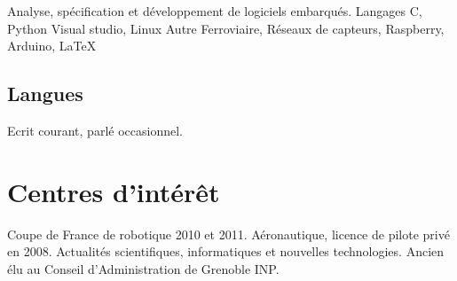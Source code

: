 \documentclass[10pt,a4paper]{moderncv}
\begin{document}
    {Analyse, spécification et développement de logiciels embarqués.\newline{}}
    {Langages}
    {C, Python}
    {Visual studio, Linux\newline{}}
    {Autre}
    {Ferroviaire, Réseaux de capteurs, Raspberry, Arduino, \LaTeX} 

  \subsection{Langues}

    {\small Ecrit courant, parlé occasionnel.\newline{}}

\section{Centres d'intérêt}
  {Coupe de France de robotique 2010 et 2011.\newline{}}
  {Aéronautique, licence de pilote privé en 2008.}
  \cvline{}
  {Actualités scientifiques, informatiques et nouvelles technologies.}
  \cvline{}
  {Ancien élu au Conseil d'Administration de Grenoble INP.}
\end{document}
